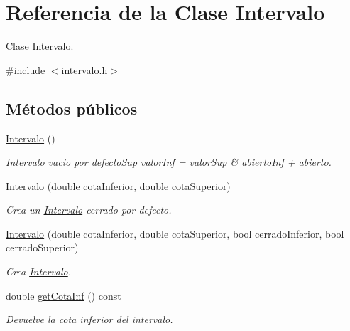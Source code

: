 \hypertarget{classIntervalo}{}\section{Referencia de la Clase Intervalo}
\label{classIntervalo}


Clase \mbox{\hyperlink{classIntervalo}{Intervalo}}.  




{\ttfamily \#include $<$intervalo.\+h$>$}

\subsection*{Métodos públicos}
\begin{DoxyCompactItemize}
\item 
\mbox{\label{classIntervalo_a9b5b23dda7ee26b444898457959cb03d}} 
\mbox{\hyperlink{classIntervalo_a9b5b23dda7ee26b444898457959cb03d}{Intervalo}} ()
\begin{DoxyCompactList}\small\item\em \mbox{\hyperlink{classIntervalo}{Intervalo}} vacio por defecto\+Sup valor\+Inf = valor\+Sup \& abierto\+Inf + abierto. \end{DoxyCompactList}\item 
\mbox{\hyperlink{classIntervalo_a321e56ef7e1f4a774bd64cc2609156f4}{Intervalo}} (double cota\+Inferior, double cota\+Superior)
\begin{DoxyCompactList}\small\item\em Crea un \mbox{\hyperlink{classIntervalo}{Intervalo}} cerrado por defecto. \end{DoxyCompactList}\item 
\mbox{\hyperlink{classIntervalo_af70d523399465f51862977a303656c72}{Intervalo}} (double cota\+Inferior, double cota\+Superior, bool cerrado\+Inferior, bool cerrado\+Superior)
\begin{DoxyCompactList}\small\item\em Crea \mbox{\hyperlink{classIntervalo}{Intervalo}}. \end{DoxyCompactList}\item 
double \mbox{\hyperlink{classIntervalo_aafa3f6ec78c6bd44b568e343fb22fc90}{get\+Cota\+Inf}} () const
\begin{DoxyCompactList}\small\item\em Devuelve la cota inferior del intervalo. \end{DoxyCompactList}\item 

\end{DoxyCompactItemize}
